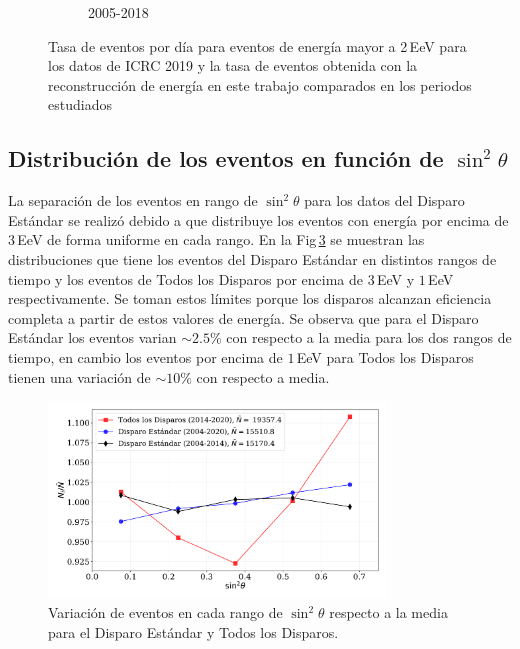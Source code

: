 \begin{figure}[H]
\begin{subfigure}[b]{0.75\textwidth}
      \caption{2005-2018}\label{fig:2EeV_expected_05_18}
      \end{subfigure}%
      \caption{Tasa de eventos por día para eventos de energía mayor a 2\,EeV para los datos de ICRC 2019 y la tasa de eventos obtenida con la reconstrucción de energía en este trabajo comparados en los periodos estudiados}\label{final}
\end{figure}


\subsection{Distribución de los eventos en función de $\sin^2\theta$}

La separación de los eventos en rango de $\sin^2\theta$ para los datos del Disparo Estándar se realizó debido a que distribuye los eventos con energía por encima de $3\,$EeV de forma uniforme en cada rango. En la Fig\,\ref{fig:bin_eventos_sin_2_theta} se muestran las distribuciones que tiene los eventos del Disparo Estándar en distintos rangos de tiempo y los eventos de Todos los Disparos por encima de $3\,$EeV y $1\,$EeV respectivamente. Se toman estos límites porque los disparos alcanzan eficiencia completa a partir de estos valores de energía.  Se observa que para el Disparo Estándar los eventos varian $\sim 2.5\%$ con respecto a la media para los dos rangos de tiempo, en cambio los eventos por encima de $1\,$EeV para Todos los Disparos tienen una variación de $\sim 10\%$ con respecto a media.

\begin{figure}[H]
  \begin{small}
    \begin{center}
      \includegraphics[width=0.8\textwidth]{bin_eventos_sin_2_theta.pdf}
    \end{center}
    \caption{Variación de eventos en cada rango de $\sin^2\theta$ respecto a la media para el Disparo Estándar y Todos los Disparos. }
    \label{fig:bin_eventos_sin_2_theta}
  \end{small}
\end{figure}

